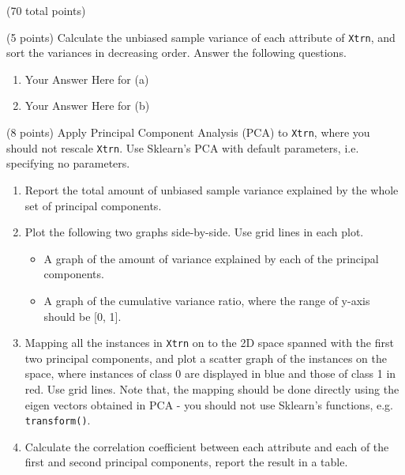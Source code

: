 \documentclass[12pt]{article}
\begin{document}
\begin{question}{(70 total points) \qOneTitle}
\begin{subquestion}{(5 points)
    Calculate the unbiased sample variance of each attribute of {\tt Xtrn}, and sort the variances in decreasing order. Answer the following questions.
  }
  \begin{answerbox}{0.5\textheight}
    \begin{enumerate}
    \item Your Answer Here for (a)
    \item Your Answer Here for (b)
    \end{enumerate}
  \end{answerbox}
  


\end{subquestion}

\begin{subquestion}{(8 points)
    Apply Principal Component Analysis (PCA) to {\tt Xtrn}, where you should not rescale {\tt Xtrn}.
    Use Sklearn's PCA with default parameters, i.e. specifying no parameters.
  }\label{q1:pca:wo/s}
  \begin{enumerate}\NARROWITEM
  \item Report the total amount of unbiased sample variance explained by the whole set of principal components.
  \item Plot the following two graphs side-by-side. Use grid lines in each plot.
    \begin{itemize}\NARROWITEM
    \item A graph of the amount of variance explained by each of the principal components.
    \item A graph of the cumulative variance ratio, where the range of y-axis should be [0, 1].
    \end{itemize}
  \item Mapping all the instances in {\tt Xtrn} on to the 2D space spanned with the first two principal components, and plot a scatter graph of the instances on the space, where instances of class 0 are displayed in blue and those of class 1 in red. Use grid lines. Note that, the mapping should be done directly using the eigen vectors obtained in PCA - you should not use Sklearn's functions, e.g. {\tt transform()}. 
  \item Calculate the correlation coefficient between each attribute and each of the first and second principal components, report the result in a table.
  \end{enumerate}
   


\end{subquestion}
\end{question}
\end{document}
